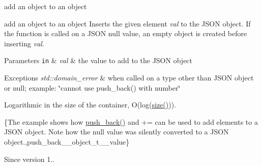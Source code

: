 add an object to an object 

add an object to an object Inserts the given element {\itshape val} to the J\+S\+ON object. If the function is called on a J\+S\+ON null value, an empty object is created before inserting {\itshape val}.


\begin{DoxyParams}[1]{Parameters}
\mbox{\tt in}  & {\em val} & the value to add to the J\+S\+ON object\\
\hline
\end{DoxyParams}

\begin{DoxyExceptions}{Exceptions}
{\em std\+::domain\+\_\+error} & when called on a type other than J\+S\+ON object or null; example\+: {\ttfamily \char`\"{}cannot use push\+\_\+back() with number\char`\"{}}\\
\hline
\end{DoxyExceptions}
Logarithmic in the size of the container, O(log({\ttfamily \hyperlink{a00025_a01833b332b68d9af1f7cd7a816c39e49}{size()}})).

\{The example shows how {\ttfamily \hyperlink{a00025_a486b96adbf4886c38e38c952394a220f}{push\+\_\+back()}} and {\ttfamily +=} can be used to add elements to a J\+S\+ON object. Note how the {\ttfamily null} value was silently converted to a J\+S\+ON object.,push\+\_\+back\+\_\+\+\_\+object\+\_\+t\+\_\+\+\_\+value\}

\begin{DoxySince}{Since}
version 1.. 
\end{DoxySince}
